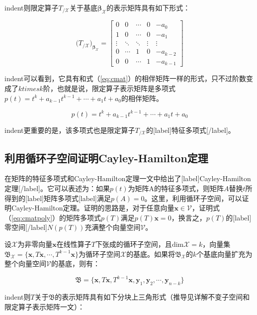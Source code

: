 \documentclass[UTF8,nofonts]{ctexart}
\begin{document}
indent则限定算子$T_{/\mathcal{X}}$关于基底$\boldsymbol{\beta}_{\mathcal{X}}$的表示矩阵具有如下形式：

\[
\Big(T_{/\mathcal{X}}\Big)_{\boldsymbol{\beta}_{\mathcal{X}}}=
\begin{bmatrix}
0&0&\cdots&0&-a_0\\
1&0&\cdots&0&-a_1\\
\vdots&\ddots&\ddots&\vdots&\vdots\\
0&\cdots&1&0&-a_{k-2}\\
0&0&\cdots&1&-a_{k-1}
\end{bmatrix}
\]

indent可以看到，它具有和式（\ref{eq:cmat}）的相伴矩阵一样的形式，只不过阶数变成了$k times k$阶，也就是说，限定算子表示矩阵是多项式$p(t)=t^k+a_{k-1}t^{k-1}+\cdots+a_1t+a_0$的相伴矩阵。

\begin{equation}
\label{eq:cmatpoly}
p(t)=t^k+a_{k-1}t^{k-1}+\cdots+a_1t+a_0
\end{equation}

indent更重要的是，该多项式也是限定算子$T_{/\mathcal{X}}$的[label]特征多项式[/label]。

\subsection*{利用循环子空间证明Cayley-Hamilton定理}

在矩阵的特征多项式和Cayley-Hamilton定理一文中给出了[label]Cayley-Hamilton定理[/label]。它可以表述为：如果$p(t)$为矩阵A的特征多项式，则矩阵$A$替换$t$所得到的[label]矩阵多项式[label]满足$p(A)=0$。这里，利用循环子空间，可以证明Cayley-Hamilton定理。证明的思路是，对于任意向量$\boldsymbol{x}\in\mathcal{V}$，证明式（\ref{eq:cmatpoly}）的矩阵多项式$p(T)$满足$p(T)\boldsymbol{x}=0$，换言之，$p(T)$的[label]零空间[/label]$N(p(T))$充满整个向量空间$\mathcal{V}$。

设$\mathcal{X}$为非零向量$\boldsymbol{x}$在线性算子$T$下张成的循环子空间，且$\text{dim}\mathcal{X}=k$，向量集$\mathfrak{B}_{\mathcal{X}}=\{\boldsymbol{x},T\boldsymbol{x},\cdots,T^{k-1}\boldsymbol{x}\}$为循环子空间$\mathcal{X}$的基底。如果将$\mathfrak{B}_{\mathcal{X}}$的$k$个基底向量扩充为整个向量空间$\mathcal{V}$的基底，则有：

\[
\mathfrak{B}=\{\boldsymbol{x},T\boldsymbol{x},T^{k-1}\boldsymbol{x},\boldsymbol{y}_1,\boldsymbol{y}_2,\cdots,\boldsymbol{y}_{n-k}\}
\]

indent则$T$关于$\mathfrak{B}$的表示矩阵具有如下分块上三角形式（推导见详解不变子空间和限定算子表示矩阵一文）：
\end{document}
